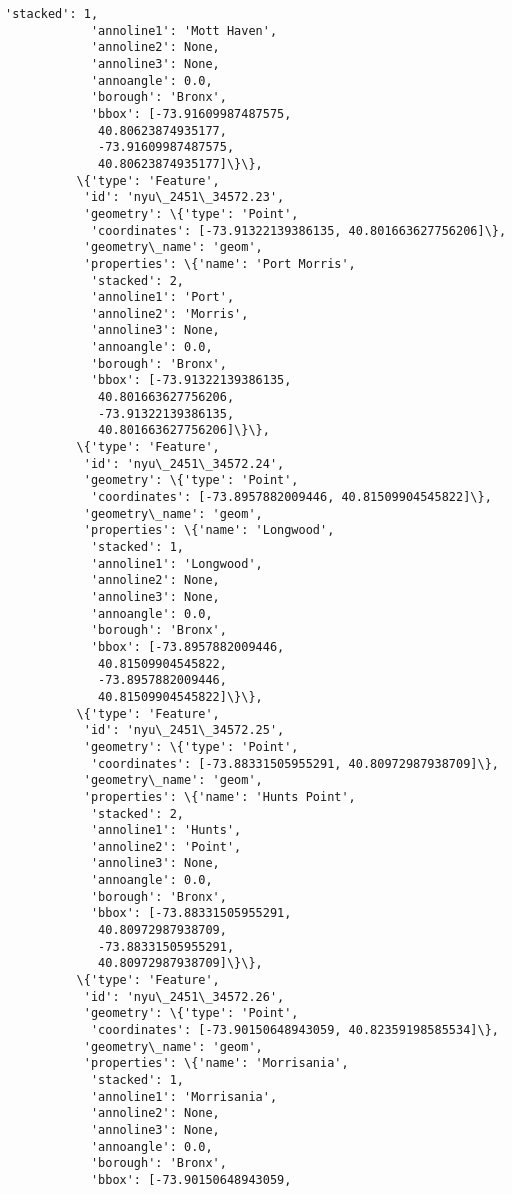 \documentclass[11pt]{article}
\begin{document}
\begin{Verbatim}[commandchars=\\\{\}]
            'stacked': 1,
            'annoline1': 'Mott Haven',
            'annoline2': None,
            'annoline3': None,
            'annoangle': 0.0,
            'borough': 'Bronx',
            'bbox': [-73.91609987487575,
             40.80623874935177,
             -73.91609987487575,
             40.80623874935177]\}\},
          \{'type': 'Feature',
           'id': 'nyu\_2451\_34572.23',
           'geometry': \{'type': 'Point',
            'coordinates': [-73.91322139386135, 40.801663627756206]\},
           'geometry\_name': 'geom',
           'properties': \{'name': 'Port Morris',
            'stacked': 2,
            'annoline1': 'Port',
            'annoline2': 'Morris',
            'annoline3': None,
            'annoangle': 0.0,
            'borough': 'Bronx',
            'bbox': [-73.91322139386135,
             40.801663627756206,
             -73.91322139386135,
             40.801663627756206]\}\},
          \{'type': 'Feature',
           'id': 'nyu\_2451\_34572.24',
           'geometry': \{'type': 'Point',
            'coordinates': [-73.8957882009446, 40.81509904545822]\},
           'geometry\_name': 'geom',
           'properties': \{'name': 'Longwood',
            'stacked': 1,
            'annoline1': 'Longwood',
            'annoline2': None,
            'annoline3': None,
            'annoangle': 0.0,
            'borough': 'Bronx',
            'bbox': [-73.8957882009446,
             40.81509904545822,
             -73.8957882009446,
             40.81509904545822]\}\},
          \{'type': 'Feature',
           'id': 'nyu\_2451\_34572.25',
           'geometry': \{'type': 'Point',
            'coordinates': [-73.88331505955291, 40.80972987938709]\},
           'geometry\_name': 'geom',
           'properties': \{'name': 'Hunts Point',
            'stacked': 2,
            'annoline1': 'Hunts',
            'annoline2': 'Point',
            'annoline3': None,
            'annoangle': 0.0,
            'borough': 'Bronx',
            'bbox': [-73.88331505955291,
             40.80972987938709,
             -73.88331505955291,
             40.80972987938709]\}\},
          \{'type': 'Feature',
           'id': 'nyu\_2451\_34572.26',
           'geometry': \{'type': 'Point',
            'coordinates': [-73.90150648943059, 40.82359198585534]\},
           'geometry\_name': 'geom',
           'properties': \{'name': 'Morrisania',
            'stacked': 1,
            'annoline1': 'Morrisania',
            'annoline2': None,
            'annoline3': None,
            'annoangle': 0.0,
            'borough': 'Bronx',
            'bbox': [-73.90150648943059,

\end{Verbatim}
\end{document}
